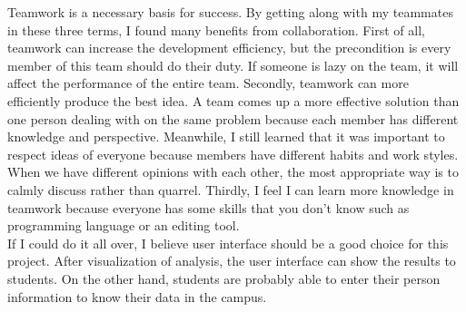 \noindent Teamwork is a necessary basis for success. By getting along with my teammates in these three terms, I found many benefits from collaboration. First of all, teamwork can increase the development efficiency, but the precondition is every member of this team should do their duty. If someone is lazy on the team, it will affect the performance of the entire team. Secondly, teamwork can more efficiently produce the best idea. A team comes up a more effective solution than one person dealing with on the same problem because each member has different knowledge and perspective. Meanwhile, I still learned that it was important to respect ideas of everyone because members have different habits and work styles. When we have different opinions with each other, the most appropriate way is to calmly discuss rather than quarrel. Thirdly, I feel I can learn more knowledge in teamwork because everyone has some skills that you don’t know such as programming language or an editing tool.\\

\noindent If I could do it all over, I believe user interface should be a good choice for this project. After visualization of analysis, the user interface can show the results to students. On the other hand, students are probably able to enter their person information to know their data in the campus. 